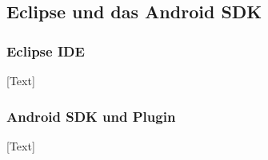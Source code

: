 
\subsection{Eclipse und das Android SDK}

\subsubsection{Eclipse IDE}
[Text]

\subsubsection{Android SDK und Plugin}
[Text]


